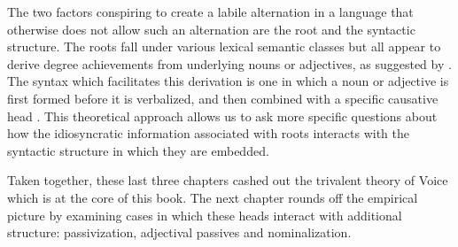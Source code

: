 
The two factors conspiring to create a labile alternation in a language that otherwise does not allow such an alternation are the root and the syntactic structure. The roots fall under various lexical semantic classes but all appear to derive degree achievements from underlying nouns or adjectives, as suggested by \cite{lev16}. The syntax which facilitates this derivation is one in which a noun or adjective is first formed before it is verbalized, and then combined with a specific causative head {\vd}. This theoretical approach allows us to ask more specific questions about how the idiosyncratic information associated with roots interacts with the syntactic structure in which they are embedded.

Taken together, these last three chapters cashed out the trivalent theory of Voice which is at the core of this book. The next chapter rounds off the empirical picture by examining cases in which these heads interact with additional structure: passivization, adjectival passives and nominalization.



